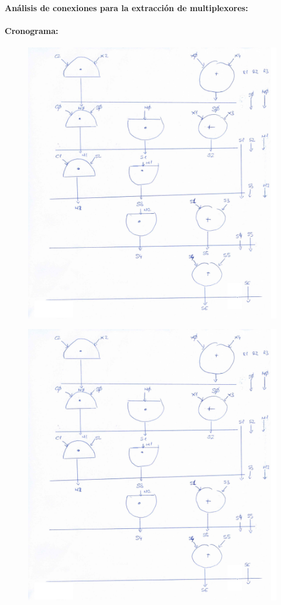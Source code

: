 \documentclass{article}
\begin{document}
\paragraph{Análisis de conexiones para la extracción de multiplexores:}


\paragraph{Cronograma:}

\begin{figure}[H]
\centering
\includegraphics[width=0.85\linewidth]{images/2_2_2.png}
\end{figure}

\begin{figure}[H]
\centering
\includegraphics[width=0.85\linewidth]{images/2_2_2.png}
\end{figure}
\end{document}
